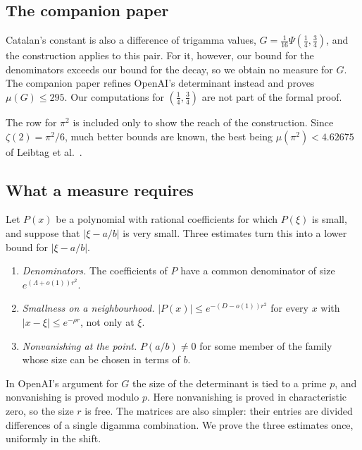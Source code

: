 \documentclass[11pt]{amsart}
\theoremstyle{definition}
\theoremstyle{remark}
\numberwithin{equation}{section}
\begin{document}
\subsection{The companion paper}
Catalan's constant is also a difference of trigamma values, $G=\frac1{16}\Psi(\frac14,\frac34)$, and the construction
applies to this pair. For it, however, our bound for the denominators exceeds our bound for the decay, so we obtain no
measure for $G$. The companion paper \cite{Litsey2026} refines OpenAI's determinant instead and proves
$\mu(G)\le295$. Our computations for $(\frac14,\frac34)$ are not part of the formal proof.

The row for $\pi^2$ is included only to show the reach of the construction. Since $\zeta(2)=\pi^2/6$, much better bounds
are known, the best being $\mu(\pi^2)<4.62675$ of Leibtag et al.\ \cite{LBKWSK26}.

\subsection{What a measure requires}
Let $P(x)$ be a polynomial with rational coefficients for which $P(\xi)$ is small, and suppose that $|\xi-a/b|$ is very
small. Three estimates turn this into a lower bound for $|\xi-a/b|$.
\begin{enumerate}[label=(\roman*)]
\item \emph{Denominators.} The coefficients of $P$ have a common denominator of size $e^{(\Lambda+o(1))r^2}$.
\item \emph{Smallness on a neighbourhood.} $|P(x)|\le e^{-(D-o(1))r^2}$ for every $x$ with $|x-\xi|\le e^{-\rho r}$,
 not only at $\xi$.
\item \emph{Nonvanishing at the point.} $P(a/b)\ne0$ for some member of the family whose size can be chosen in terms
 of $b$.
\end{enumerate}
In OpenAI's argument for $G$ the size of the determinant is tied to a prime $p$, and nonvanishing is proved modulo $p$.
Here nonvanishing is proved in characteristic zero, so the size $r$ is free. The matrices are also simpler: their
entries are divided differences of a single digamma combination. We prove the three estimates once, uniformly in the
shift.
\end{document}
